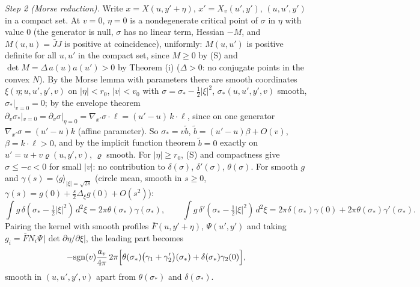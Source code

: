 \emph{Step 2 (Morse reduction).} Write $x = X(u, y' + \eta)$, $x' = X_{v}(u', y')$, $(u, u', y')$ in a compact set. At $v = 0$, $\eta = 0$ is a nondegenerate critical point of $\sigma$ in $\eta$ with value $0$ (the generator is null, $\sigma$ has no linear term, Hessian $-M$, and $M(u, u) = \bar JJ$ is positive at coincidence), uniformly: $M(u, u')$ is positive definite for all $u, u'$ in the compact set, since $M \ge 0$ by (S) and $\det M = \Delta\,a(u)a(u') > 0$ by Theorem (i) ($\Delta > 0$: no conjugate points in the convex $N$). By the Morse lemma with parameters \cite[App.~C]{Hormander1985} there are smooth coordinates $\xi(\eta; u, u', y', v)$ on $|\eta| < r_{0}$, $|v| < v_{0}$ with $\sigma = \sigma_{*} - \tfrac12|\xi|^{2}$, $\sigma_{*}(u, u', y', v)$ smooth, $\sigma_{*}|_{v = 0} = 0$; by the envelope theorem $\partial_{v}\sigma_{*}|_{v = 0} = \partial_{v}\sigma|_{\eta = 0} = \nabla_{x'}\sigma\cdot\ell = (u' - u)\,k\cdot\ell$, since on one generator $\nabla_{x'}\sigma = (u' - u)k$ (affine parameter). So $\sigma_{*} = v\tilde b$, $\tilde b = (u' - u)\beta + O(v)$, $\beta = k\cdot\ell > 0$, and by the implicit function theorem $\tilde b = 0$ exactly on $u' = u + v\varrho(u, y', v)$, $\varrho$ smooth. For $|\eta| \ge r_{0}$, (S) and compactness give $\sigma \le -c < 0$ for small $|v|$: no contribution to $\delta(\sigma)$, $\delta'(\sigma)$, $\theta(\sigma)$. For smooth $g$ and $\gamma(s) = \langle g\rangle_{|\xi| = \sqrt{2s}}$ (circle mean, smooth in $s \ge 0$, $\gamma(s) = g(0) + \tfrac{s}{2}\Delta_{\xi}g(0) + O(s^{2})$):
\[
\int g\,\delta(\sigma_{*} - \tfrac12|\xi|^{2})\,d^{2}\xi = 2\pi\theta(\sigma_{*})\gamma(\sigma_{*}),\qquad
\int g\,\delta'(\sigma_{*} - \tfrac12|\xi|^{2})\,d^{2}\xi = 2\pi\delta(\sigma_{*})\gamma(0) + 2\pi\theta(\sigma_{*})\gamma'(\sigma_{*}).
\]
Pairing the kernel with smooth profiles $\bar F(u, y' + \eta)$, $\Psi(u', y')$ and taking $g_{i} = \bar F N_{i}\Psi\,|\det\partial\eta/\partial\xi|$, the leading part becomes
\[
-\mathrm{sgn}(v)\frac{a_{v}}{4\pi}\,2\pi\Bigl[\theta(\sigma_{*})\bigl(\gamma_{1} + \gamma_{2}'\bigr)(\sigma_{*}) + \delta(\sigma_{*})\gamma_{2}(0)\Bigr],
\]
smooth in $(u, u', y', v)$ apart from $\theta(\sigma_{*})$ and $\delta(\sigma_{*})$.

